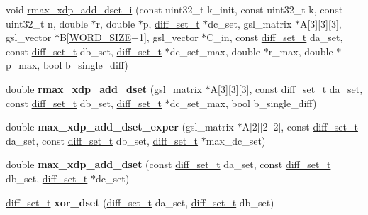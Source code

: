 \begin{DoxyCompactItemize}
\item 
void \hyperlink{xdp-add-diff-set_8hh_a17545da84d6f6dec510d4363ea09e75a}{rmax\-\_\-xdp\-\_\-add\-\_\-dset\-\_\-i} (const uint32\-\_\-t k\-\_\-init, const uint32\-\_\-t k, const uint32\-\_\-t n, double $\ast$r, double $\ast$p, \hyperlink{structdiff__set__t}{diff\-\_\-set\-\_\-t} $\ast$dc\-\_\-set, gsl\-\_\-matrix $\ast$\-A\mbox{[}3\mbox{]}\mbox{[}3\mbox{]}\mbox{[}3\mbox{]}, gsl\-\_\-vector $\ast$\-B\mbox{[}\hyperlink{common_8hh_a92ed8507d1cd2331ad09275c5c4c1c89}{\-W\-O\-R\-D\-\_\-\-S\-I\-Z\-E}+1\mbox{]}, gsl\-\_\-vector $\ast$\-C\-\_\-in, const \hyperlink{structdiff__set__t}{diff\-\_\-set\-\_\-t} da\-\_\-set, const \hyperlink{structdiff__set__t}{diff\-\_\-set\-\_\-t} db\-\_\-set, \hyperlink{structdiff__set__t}{diff\-\_\-set\-\_\-t} $\ast$dc\-\_\-set\-\_\-max, double $\ast$r\-\_\-max, double $\ast$p\-\_\-max, bool b\-\_\-single\-\_\-diff)
\item 
\hypertarget{xdp-add-diff-set_8hh_aaa950f2ce67c8a69f7c1cf2a880e7a38}{double {\bfseries rmax\-\_\-xdp\-\_\-add\-\_\-dset} (gsl\-\_\-matrix $\ast$\-A\mbox{[}3\mbox{]}\mbox{[}3\mbox{]}\mbox{[}3\mbox{]}, const \hyperlink{structdiff__set__t}{diff\-\_\-set\-\_\-t} da\-\_\-set, const \hyperlink{structdiff__set__t}{diff\-\_\-set\-\_\-t} db\-\_\-set, \hyperlink{structdiff__set__t}{diff\-\_\-set\-\_\-t} $\ast$dc\-\_\-set\-\_\-max, bool b\-\_\-single\-\_\-diff)}\label{xdp-add-diff-set_8hh_aaa950f2ce67c8a69f7c1cf2a880e7a38}

\item 
\hypertarget{xdp-add-diff-set_8hh_ab3326ae987c725f0ae34087e12950be4}{double {\bfseries max\-\_\-xdp\-\_\-add\-\_\-dset\-\_\-exper} (gsl\-\_\-matrix $\ast$\-A\mbox{[}2\mbox{]}\mbox{[}2\mbox{]}\mbox{[}2\mbox{]}, const \hyperlink{structdiff__set__t}{diff\-\_\-set\-\_\-t} da\-\_\-set, const \hyperlink{structdiff__set__t}{diff\-\_\-set\-\_\-t} db\-\_\-set, \hyperlink{structdiff__set__t}{diff\-\_\-set\-\_\-t} $\ast$max\-\_\-dc\-\_\-set)}\label{xdp-add-diff-set_8hh_ab3326ae987c725f0ae34087e12950be4}

\item 
\hypertarget{xdp-add-diff-set_8hh_a00e0dee2bb0807f849fac59f55279e8d}{double {\bfseries max\-\_\-xdp\-\_\-add\-\_\-dset} (const \hyperlink{structdiff__set__t}{diff\-\_\-set\-\_\-t} da\-\_\-set, const \hyperlink{structdiff__set__t}{diff\-\_\-set\-\_\-t} db\-\_\-set, \hyperlink{structdiff__set__t}{diff\-\_\-set\-\_\-t} $\ast$dc\-\_\-set)}\label{xdp-add-diff-set_8hh_a00e0dee2bb0807f849fac59f55279e8d}

\item 
\hypertarget{xdp-add-diff-set_8hh_ad3acfec7eb08dd0e2d461409fcafdcfd}{\hyperlink{structdiff__set__t}{diff\-\_\-set\-\_\-t} {\bfseries xor\-\_\-dset} (\hyperlink{structdiff__set__t}{diff\-\_\-set\-\_\-t} da\-\_\-set, \hyperlink{structdiff__set__t}{diff\-\_\-set\-\_\-t} db\-\_\-set)}\label{xdp-add-diff-set_8hh_ad3acfec7eb08dd0e2d461409fcafdcfd}


\end{DoxyCompactItemize}
